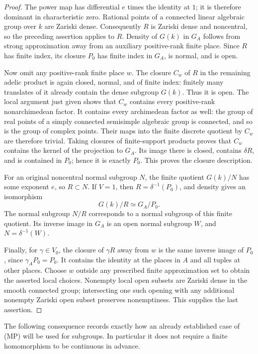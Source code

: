 \begin{proof}
The power map has differential \(e\) times the identity at \(1\);
it is therefore dominant in characteristic zero.  Rational points
of a connected linear algebraic group over \(k\) are Zariski dense.
Consequently \(R\) is Zariski dense and noncentral, so the preceding
assertion applies to \(R\).
Density of \(G(k)\) in \(G_A\) follows from strong approximation away
from an auxiliary positive-rank finite place.  Since \(R\) has finite
index, its closure \(P_0\) has finite index in \(G_A\), is normal, and
is open.

Now omit any positive-rank finite place \(w\).  The closure \(C_w\)
of \(R\) in the remaining adelic product is again closed, normal,
and of finite index: finitely many translates of it already contain
the dense subgroup \(G(k)\).  Thus it is open.  The local argument
just given shows that \(C_w\) contains every positive-rank
nonarchimedean factor.  It contains every archimedean factor as well:
the group of real points of a simply connected semisimple algebraic
group is connected, and so is the group of complex points.  Their
maps into the finite discrete quotient by \(C_w\) are therefore
trivial.  Taking closures of finite-support products proves that
\(C_w\) contains the kernel of the projection to \(G_A\).
Its image there is closed, contains \(\delta R\), and is contained
in \(P_0\); hence it is exactly \(P_0\).  This proves the closure
description.

For an original noncentral normal subgroup \(N\), the finite quotient
\(G(k)/N\) has some exponent \(e\), so \(R\subset N\).  If \(V=1\),
then \(R=\delta^{-1}(P_0)\), and density gives an isomorphism
\[
                         G(k)/R \simeq G_A/P_0 .
\]
The normal subgroup \(N/R\) corresponds to a normal subgroup of this
finite quotient.  Its inverse image in \(G_A\) is an open normal
subgroup \(W\), and \(N=\delta^{-1}(W)\).

Finally, for \(\gamma\in V_0\), the closure of \(\gamma R\) away
from \(w\) is the same inverse image of \(P_0\), since
\(\gamma_A P_0=P_0\).  It contains the identity at the places in \(A\)
and all tuples at other places.  Choose \(w\) outside any prescribed
finite approximation set to obtain the asserted local choices.
Nonempty local open subsets are Zariski dense in the smooth connected
group; intersecting one such opening with any additional nonempty
Zariski open subset preserves nonemptiness.  This supplies the last
assertion.
\end{proof}

The following consequence records exactly how an already established
case of (MP) will be used for subgroups.  In particular it does not
require a finite homomorphism to be continuous in advance.

